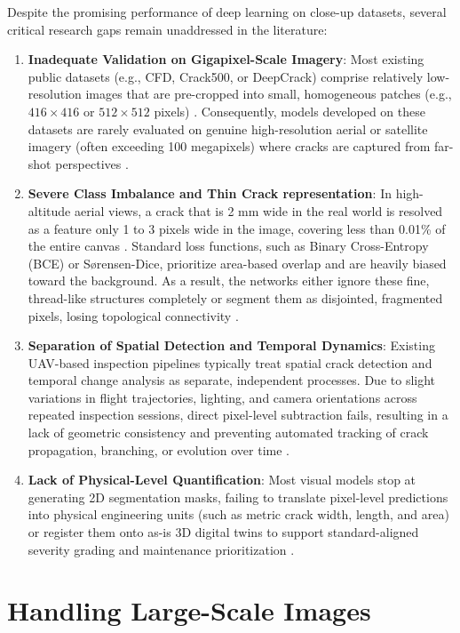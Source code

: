 Despite the promising performance of deep learning on close-up datasets, several critical research gaps remain unaddressed in the literature:
\begin{enumerate}
    \item \textbf{Inadequate Validation on Gigapixel-Scale Imagery}: Most existing public datasets (e.g., CFD, Crack500, or DeepCrack) comprise relatively low-resolution images that are pre-cropped into small, homogeneous patches (e.g., $416 \times 416$ or $512 \times 512$ pixels) \cite{zhao-2026}. Consequently, models developed on these datasets are rarely evaluated on genuine high-resolution aerial or satellite imagery (often exceeding 100 megapixels) where cracks are captured from far-shot perspectives \cite{akyon-2022,zhang-2024c}.
    \item \textbf{Severe Class Imbalance and Thin Crack representation}: In high-altitude aerial views, a crack that is 2 mm wide in the real world is resolved as a feature only 1 to 3 pixels wide in the image, covering less than 0.01\% of the entire canvas \cite{akyon-2022}. Standard loss functions, such as Binary Cross-Entropy (BCE) or Sørensen-Dice, prioritize area-based overlap and are heavily biased toward the background. As a result, the networks either ignore these fine, thread-like structures completely or segment them as disjointed, fragmented pixels, losing topological connectivity \cite{pereira-2025,kirchhoff-2024}.
    \item \textbf{Separation of Spatial Detection and Temporal Dynamics}: Existing UAV-based inspection pipelines typically treat spatial crack detection and temporal change analysis as separate, independent processes. Due to slight variations in flight trajectories, lighting, and camera orientations across repeated inspection sessions, direct pixel-level subtraction fails, resulting in a lack of geometric consistency and preventing automated tracking of crack propagation, branching, or evolution over time \cite{wang-2025}.
    \item \textbf{Lack of Physical-Level Quantification}: Most visual models stop at generating 2D segmentation masks, failing to translate pixel-level predictions into physical engineering units (such as metric crack width, length, and area) or register them onto as-is 3D digital twins to support standard-aligned severity grading and maintenance prioritization \cite{zhen-liang-2025,zhao-2026}.
\end{enumerate}

\section{Handling Large-Scale Images}

